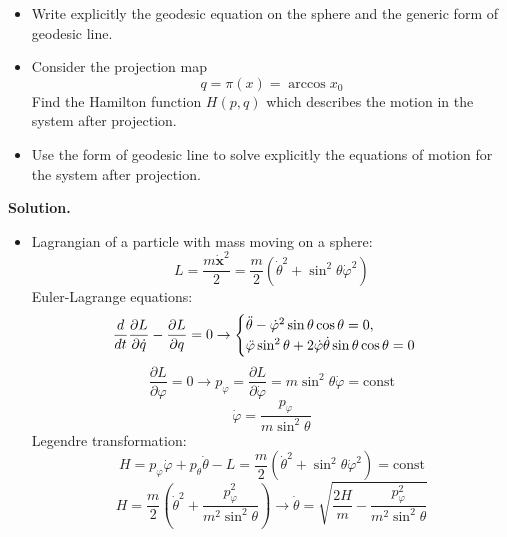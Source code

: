 \documentclass[12pt]{article}
\theoremstyle{definition}
\begin{document}
\begin{enumerate}
\begin{itemize}
        \item Write explicitly the geodesic equation on the sphere and the generic form of geodesic line.
        \item Consider the projection map
        \begin{equation}
            q=\pi(x)=\arccos x_0
        \end{equation}
        Find the Hamilton function $H(p, q)$ which describes the motion in the system after projection.
        \item Use the form of geodesic line to solve explicitly the equations of motion for the system after projection.
    \end{itemize}
    \textbf{Solution.}
    \begin{itemize}
        \item Lagrangian of a particle with mass moving on a sphere:
        \begin{equation}
            L=\frac{m\dot{\bm{x}}^2}{2}=\frac{m}{2}(\dot{\theta}^2+\sin^2\theta\dot{\varphi}^2)
        \end{equation}
        Euler-Lagrange equations:
        \begin{equation}
            \frac{d}{dt}\frac{\partial L}{\partial\dot{q}}-\frac{\partial L}{\partial q}=0\rightarrow\begin{cases}
                \Ddot{\theta}-\dot{\varphi}^2\sin\theta\cos\theta=0,\\
                \Ddot{\varphi}\sin^2\theta+2\dot{\varphi}\dot{\theta}\sin\theta\cos\theta=0
            \end{cases}
        \end{equation}
        \begin{equation}
            \frac{\partial L}{\partial\varphi}=0\rightarrow p_\varphi=\frac{\partial L}{\partial\dot{\varphi}}=m\sin^2\theta\dot{\varphi}=\text{const}
        \end{equation}
        \begin{equation}
            \dot{\varphi}=\frac{p_\varphi}{m\sin^2\theta}
        \end{equation}
        Legendre transformation:
        \begin{equation}
            H=p_\varphi\dot{\varphi}+p_\theta\dot{\theta}-L=\frac{m}{2}(\dot{\theta}^2+\sin^2\theta\dot{\varphi}^2)=\text{const}
        \end{equation}
        \begin{equation}
            H=\frac{m}{2}\left(\dot{\theta}^2+\frac{p^2_\varphi}{m^2\sin^2\theta}\right)\rightarrow\dot{\theta}=\sqrt{\frac{2H}{m}-\frac{p^2_\varphi}{m^2\sin^2\theta}}

\end{equation}
\end{itemize}
\end{enumerate}
\end{document}
